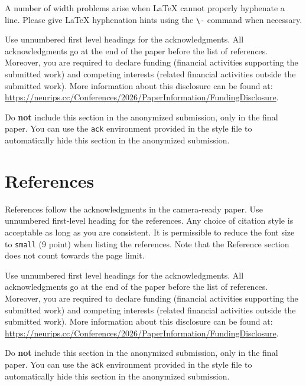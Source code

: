 \documentclass{article}
\begin{document}
A number of width problems arise when \LaTeX{} cannot properly hyphenate a
line. Please give LaTeX hyphenation hints using the \verb+\-+ command when
necessary.

\begin{ack}
Use unnumbered first level headings for the acknowledgments. All acknowledgments
go at the end of the paper before the list of references. Moreover, you are required to declare
funding (financial activities supporting the submitted work) and competing interests (related financial activities outside the submitted work).
More information about this disclosure can be found at: \url{https://neurips.cc/Conferences/2026/PaperInformation/FundingDisclosure}.


Do {\bf not} include this section in the anonymized submission, only in the final paper. You can use the \texttt{ack} environment provided in the style file to automatically hide this section in the anonymized submission.
\end{ack}

\section*{References}


References follow the acknowledgments in the camera-ready paper. Use unnumbered first-level heading for
the references. Any choice of citation style is acceptable as long as you are
consistent. It is permissible to reduce the font size to \verb+small+ (9 point)
when listing the references.
Note that the Reference section does not count towards the page limit.
\medskip

\begin{ack}
Use unnumbered first level headings for the acknowledgments. All acknowledgments
go at the end of the paper before the list of references. Moreover, you are required to declare
funding (financial activities supporting the submitted work) and competing interests (related financial activities outside the submitted work).
More information about this disclosure can be found at: \url{https://neurips.cc/Conferences/2026/PaperInformation/FundingDisclosure}.

Do {\bf not} include this section in the anonymized submission, only in the final paper. You can use the \texttt{ack} environment provided in the style file to automatically hide this section in the anonymized submission.
\end{ack}



\end{document}
